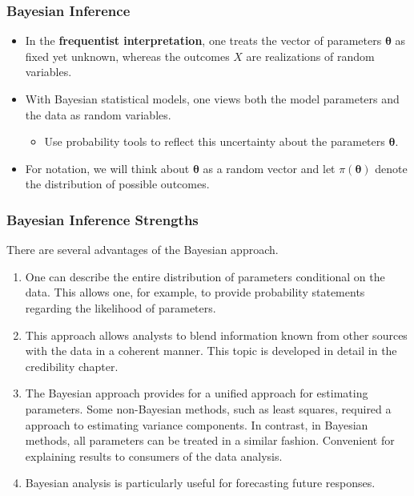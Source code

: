 \documentclass{beamer}
\begin{document}
\begin{frame}%
\frametitle{Bayesian Inference}
\begin{itemize}
\item In the \textbf{frequentist interpretation},  one treats the vector of parameters $\boldsymbol \theta$ as fixed yet unknown, whereas the outcomes $X$ are realizations of random variables.
\item With Bayesian statistical models, one views both the model parameters and the data as random variables.
\begin{itemize} \item Use probability tools to reflect this uncertainty about the parameters $\boldsymbol \theta$. \end{itemize}
\item For notation, we will think about $\boldsymbol \theta$ as a random
vector and let $\pi(\boldsymbol \theta)$ denote the distribution of possible
outcomes.
\end{itemize}
\end{frame}


\begin{frame}%
\frametitle{Bayesian Inference Strengths}
There are several advantages of the Bayesian approach.
\begin{enumerate}
\item One can describe the entire distribution of parameters conditional on the data. This allows one, for example, to provide probability statements regarding the likelihood of parameters.
\item This approach allows analysts to blend information known from other sources with the data in a coherent manner. This topic is developed in detail in the credibility chapter.
\item The Bayesian approach provides for a unified approach for estimating parameters. Some non-Bayesian methods, such as least squares, required a approach to estimating variance components. In contrast, in Bayesian methods, all parameters can be treated in a similar fashion. Convenient for explaining results to consumers of the data analysis.
\item Bayesian analysis is particularly useful for forecasting future responses.
\end{enumerate}
\end{frame}
\end{document}
